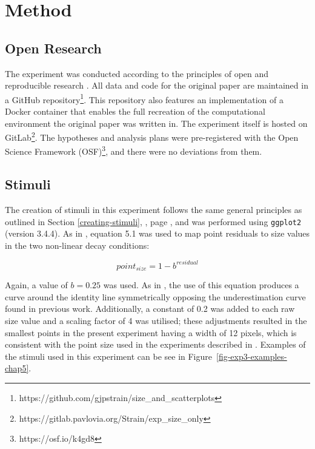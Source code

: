 \documentclass[../main.tex]{subfiles}
\begin{document}
\section{Method}\label{method-e3}

\subsection{Open Research}\label{open-research-chap5}

The experiment was conducted according to the principles of open and
reproducible research \cite{ayris_2018}. All data and code for the
original paper are maintained in a GitHub repository\footnote{https://github.com/gjpstrain/size\_and\_scatterplots}.
This repository also features an implementation of a Docker container
that enables the full recreation of the computational environment the
original paper was written in. The experiment itself is hosted on
GitLab\footnote{https://gitlab.pavlovia.org/Strain/exp\_size\_only}. The
hypotheses and analysis plans were pre-registered with the Open Science
Framework (OSF)\footnote{https://osf.io/k4gd8}, and there were no
deviations from them.

\subsection{Stimuli}\label{stimuli-e3}

The creation of stimuli in this experiment follows the same general
principles as outlined in Section \ref{creating-stimuli},
, page \pageref{creating-stimuli}, and was
performed using \texttt{ggplot2} (version 3.4.4). As in
, equation 5.1 was used to map point
residuals to size values in the two non-linear decay conditions:

\begin{equation}
  point_{size} = 1 - b^{residual}
\end{equation}

Again, a value of \(b = 0.25\) was used. As in
, the use of this equation produces a curve
around the identity line symmetrically opposing the underestimation
curve found in previous work. Additionally, a constant of 0.2 was added
to each raw size value and a scaling factor of 4 was utilised; these
adjustments resulted in the smallest points in the present experiment
having a width of 12 pixels, which is consistent with the point size
used in the experiments described in .
Examples of the stimuli used in this experiment can be see in
Figure~\ref{fig-exp3-examples-chap5}.
\end{document}
